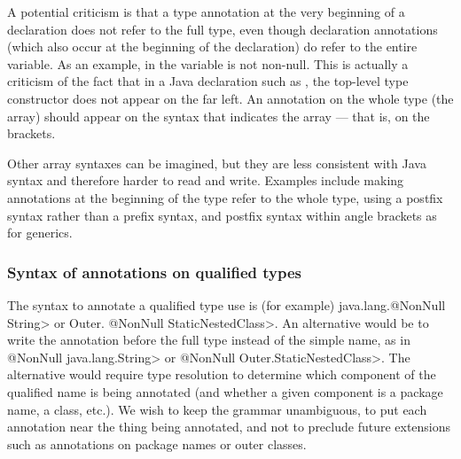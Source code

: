 \documentclass[10pt]{article}
\newcommand{\preverbnegspace}{\vspace{-5pt}}
\begin{document}

A potential criticism is that a type annotation at the very beginning of a
declaration does not refer to the full type, even though declaration
annotations (which also occur at the beginning of
the declaration) do refer to the entire variable.  As an example, in
 the variable  is not non-null.
This is actually a criticism of the fact that in a Java declaration such as
, the top-level type constructor does not appear on
the far left.
An annotation on the whole type (the array) should
appear on the syntax that indicates the array --- that is, on the brackets.


Other array syntaxes can be imagined, but they are less consistent with
Java syntax and therefore harder to read and write.
Examples include
making annotations at the beginning of the type refer to the whole type,
using a postfix syntax rather than a prefix syntax, and postfix syntax
within angle brackets as for generics.






\subsubsection{Syntax of annotations on qualified types\label{qualified-type-syntax}}

The syntax to annotate a qualified type use is (for example) 
\<java.lang.@NonNull String> or \<Outer. @NonNull StaticNestedClass>.
An alternative would be to write the annotation before the full type
instead of the simple name, as in \<@NonNull java.lang.String> or
\<@NonNull Outer.StaticNestedClass>.  The alternative would require type
resolution to determine which component of the qualified name is being
annotated (and whether a given component is a package name, a class, etc.).
We wish to keep the grammar unambiguous, to put each annotation near the
thing being annotated, and not to preclude future extensions such as
annotations on package names or outer classes.
\end{document}
